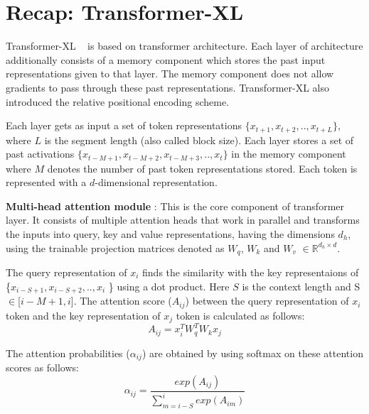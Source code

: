 \documentclass[11pt]{article}
\begin{document}





\appendix

\section{Recap: Transformer-XL}
\label{appendix:recap_txl}


Transformer-XL ~\citep{DBLP:conf/acl/DaiYYCLS19} is based on transformer architecture. Each layer of  architecture additionally consists of a memory component which stores the past input representations given to that layer. The memory component does not allow gradients to pass through these past representations. Transformer-XL also introduced the relative positional encoding scheme.




Each layer gets as input a set of token representations $ \{ x_{t+1}, x_{t+2}, .. ,  x_{t+L} \} $, where $L$ is the segment length (also called block size). Each layer stores a set of past activations $ \{ x_{t-M+1}, x_{t-M+2}, x_{t- M+3}, ..,  x_{t} \} $ in the memory component where $M$  denotes the number of past token representations stored. Each token is represented with a $d$-dimensional representation.



\textbf{Multi-head attention module} : This is the core component of transformer layer. It consists of multiple attention heads that work in parallel and transforms the inputs into query, key and value representations, having the dimensions $d_h$, using the trainable projection matrices denoted as $W_q$, $W_k$ and $W_v$  $\in \mathbb{R}^{d_h \times d}$.


The query representation of $x_{i}$ finds the similarity with the key representaions of \{$x_{i-S+1}, x_{i-S+2},. . ,   x_{i}$ \} using a dot product. Here $S$ is the context length and S $\in$[$i-M+1,i$]. The attention score ($A_{ij}$) between the query representation of $x_{i}$ token and the key representation of $x_j$ token is calculated as follows:
\begin{equation}
\label{eqn:score}
     A_{ij}= x_{i}^T  W_q^T  W_k x_{j}
\end{equation}
   

The attention probabilities ($\alpha_{ij}$) are obtained by using softmax on these attention scores as follows:
\begin{equation}
\label{eqn:attn_prob}
    \alpha_{ij}= \frac{exp( A_{ij} )}{\sum_{m= i-S}^{i} exp( A_{im} )}
\end{equation}
\end{document}
